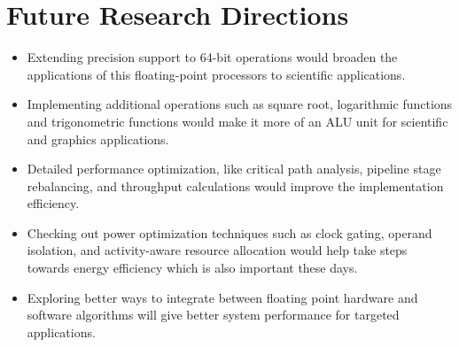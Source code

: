 \section{Future Research Directions}
\label{sec:future_directions}

\begin{itemize}
    \item Extending precision support to 64-bit operations would broaden the applications of this floating-point processors to scientific applications.
    
    \item Implementing additional operations such as square root, logarithmic functions and trigonometric functions would make it more of an ALU unit for scientific and graphics applications.
    
    \item Detailed performance optimization, like critical path analysis, pipeline stage rebalancing, and throughput calculations would improve the implementation efficiency.
    
    \item Checking out power optimization techniques such as clock gating, operand isolation, and activity-aware resource allocation would help take steps towards energy efficiency which is also important these days.
    
    \item Exploring better ways to integrate between floating point hardware and software algorithms will give better system performance for targeted applications.
\end{itemize}